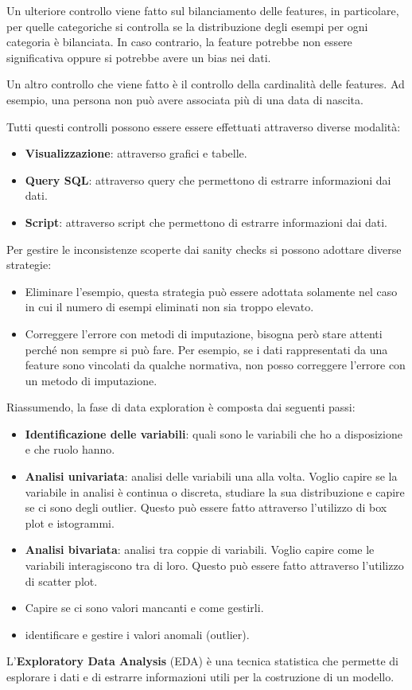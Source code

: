 Un ulteriore controllo viene fatto sul bilanciamento delle features, in particolare,
per quelle categoriche si controlla se la distribuzione degli esempi per ogni
categoria è bilanciata. In caso contrario, la feature potrebbe non essere significativa
oppure si potrebbe avere un bias nei dati.

Un altro controllo che viene fatto è il controllo della cardinalità delle features.
Ad esempio, una persona non può avere associata più di una data di nascita.

Tutti questi controlli possono essere essere effettuati attraverso diverse modalità:
\begin{itemize}
    \item \textbf{Visualizzazione}: attraverso grafici e tabelle.
    \item \textbf{Query SQL}: attraverso query che permettono di estrarre
          informazioni dai dati.
    \item \textbf{Script}: attraverso script che permettono di estrarre
          informazioni dai dati.
\end{itemize}

Per gestire le inconsistenze scoperte dai sanity checks si possono adottare diverse
strategie:
\begin{itemize}
    \item Eliminare l'esempio, questa strategia può essere adottata solamente
          nel caso in cui il numero di esempi eliminati non sia troppo elevato.
    \item Correggere l'errore con metodi di imputazione, bisogna però stare
          attenti perché non sempre si può fare. Per esempio, se i dati
          rappresentati da una feature sono vincolati da qualche normativa,
          non posso correggere l'errore con un metodo di imputazione.
\end{itemize}
Riassumendo, la fase di data exploration è composta dai seguenti passi:
\begin{itemize}
    \item \textbf{Identificazione delle variabili}: quali sono le variabili che ho
          a disposizione e che ruolo hanno.
    \item \textbf{Analisi univariata}: analisi delle variabili una alla volta.
          Voglio capire se la variabile in analisi è continua o discreta,
          studiare la sua distribuzione e capire se ci sono degli outlier. Questo
          può essere fatto attraverso l'utilizzo di box plot e istogrammi.
    \item \textbf{Analisi bivariata}: analisi tra coppie di variabili. Voglio
          capire come le variabili interagiscono tra di loro. Questo può essere
          fatto attraverso l'utilizzo di scatter plot.
    \item Capire se ci sono valori mancanti e come gestirli.
    \item identificare e gestire i valori anomali (outlier).
\end{itemize}
\begin{definizione}
    L'\textbf{Exploratory Data Analysis} (EDA) è una tecnica statistica che permette
    di esplorare i dati e di estrarre informazioni utili per la costruzione di un
    modello.
\end{definizione}

